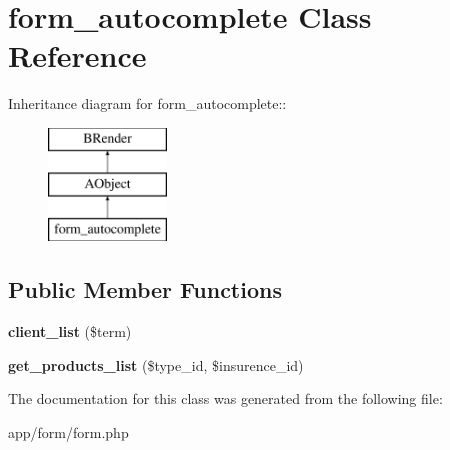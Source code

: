 \section{form\_\-autocomplete Class Reference}
\label{classform__autocomplete}
Inheritance diagram for form\_\-autocomplete::\begin{figure}[H]
\begin{center}
\leavevmode
\includegraphics[height=3cm]{classform__autocomplete}
\end{center}
\end{figure}
\subsection*{Public Member Functions}
\begin{DoxyCompactItemize}
\item 
{\bfseries client\_\-list} (\$term)\label{classform__autocomplete_abc20c16e5558c5dba560e585045d917f}

\item 
{\bfseries get\_\-products\_\-list} (\$type\_\-id, \$insurence\_\-id)\label{classform__autocomplete_a6243f1b640201fd404bb6535c448b239}

\end{DoxyCompactItemize}


The documentation for this class was generated from the following file:\begin{DoxyCompactItemize}
\item 
app/form/form.php\end{DoxyCompactItemize}
